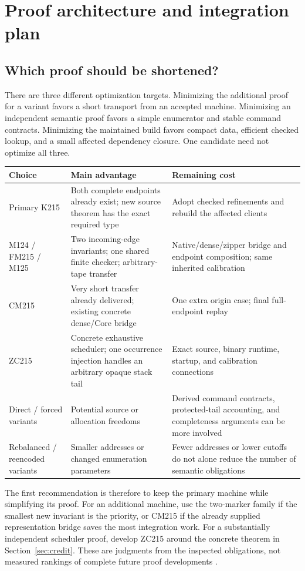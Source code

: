 \section{Proof architecture and integration plan}\label{sec:integration}

\subsection{Which proof should be shortened?}

There are three different optimization targets. Minimizing the additional
proof for a variant favors a short transport from an accepted machine.
Minimizing an independent semantic proof favors a simple enumerator and
stable command contracts. Minimizing the maintained build favors compact
data, efficient checked lookup, and a small affected dependency closure.
One candidate need not optimize all three.

\begin{longtable}{@{}P{.25\textwidth}P{.31\textwidth}P{.38\textwidth}@{}}
\toprule
Choice & Main advantage & Remaining cost\\\midrule\endhead
Primary K215 & Both complete endpoints already exist; new source theorem
has the exact required type & Adopt checked refinements and rebuild the
affected clients\\[4pt]
M124 / FM215 / M125 & Two incoming-edge invariants; one shared finite
checker; arbitrary-tape transfer & Native/dense/zipper bridge and endpoint
composition; same inherited calibration\\[4pt]
CM215 & Very short transfer already delivered; existing concrete dense/Core
bridge & One extra origin case; final full-endpoint replay\\[4pt]
ZC215 & Concrete exhaustive scheduler; one occurrence injection handles an
arbitrary opaque stack tail & Exact source, binary runtime, startup, and
calibration connections\\[4pt]
Direct / forced variants & Potential source or allocation freedoms &
Derived command contracts, protected-tail accounting, and completeness
arguments can be more involved\\[4pt]
Rebalanced / reencoded variants & Smaller addresses or changed enumeration
parameters & Fewer addresses or lower cutoffs do not alone reduce the
number of semantic obligations\\
\bottomrule
\end{longtable}

The first recommendation is therefore to keep the primary machine while
simplifying its proof. For an additional machine, use the two-marker
family if the smallest new invariant is the priority, or CM215 if the
already supplied representation bridge saves the most integration work.
For a substantially independent scheduler proof, develop ZC215 around
the concrete theorem in Section~\ref{sec:credit}. These are judgments
from the inspected obligations, not measured rankings of complete future
proof developments \cite{alternatives,incoming}.

